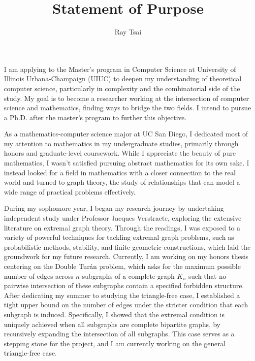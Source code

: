\documentclass[12pt]{article}
\title{Statement of Purpose}
\author{Ray Tsai}
\date{}
\begin{document}
\maketitle

\vspace{-0.25in}

I am applying to the Master's program in Computer Science at University of Illinois Urbana-Champaign
(UIUC) to deepen my understanding of theoretical computer science, particularly in complexity and
the combinatorial side of the study. My goal is to become a researcher working at the intersection
of computer science and mathematics, finding ways to bridge the two fields. I intend to pursue a
Ph.D. after the master's program to further this objective.

As a mathematics-computer science major at UC San Diego, I dedicated most of my attention to
mathematics in my undergraduate studies, primarily through honors and graduate-level coursework.
While I appreciate the beauty of pure mathematics, I wasn't satisfied pursuing abstract mathematics
for its own sake. I instead looked for a field in mathematics with a closer connection to the real
world and turned to graph theory, the study of relationships that can model a wide range of
practical problems effectively.

During my sophomore year, I began my research journey by undertaking independent study under
Professor Jacques Verstraete, exploring the extensive literature on extremal graph theory. Through
the readings, I was exposed to a variety of powerful techniques for tackling extremal graph
problems, such as probabilistic methods, stability, and finite geometric constructions, which laid
the groundwork for my future research. Currently, I am working on my honors thesis centering on the
Double Turán problem, which asks for the maximum possible number of edges across $n$ subgraphs of a
complete graph $K_n$ such that no pairwise intersection of these subgraphs contain a specified
forbidden structure. After dedicating my summer to studying the triangle-free case, I established a
tight upper bound on the number of edges under the stricter condition that each subgraph is induced.
Specifically, I showed that the extremal condition is uniquely achieved when all subgraphs are
complete bipartite graphs, by recursively expanding the intersection of all subgraphs. This case
serves as a stepping stone for the project, and I am currently working on the general triangle-free
case. 
\end{document}
